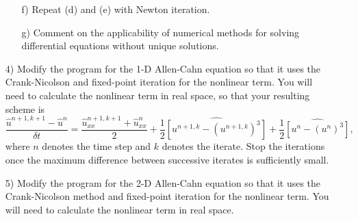 \begin{enumerate}
\begin{enumerate}
\item[f)] Repeat (d) and (e) with Newton iteration.
\item[g)] Comment on the applicability of numerical methods for solving differential equations without unique solutions.
\end{enumerate}
\item[4)] Modify the program for the 1-D Allen-Cahn equation so that it uses the Crank-Nicolson and fixed-point iteration for the nonlinear term. You will need to calculate the nonlinear term in real space, so that your resulting scheme is
\begin{equation}
\frac{\hat{u}^{n+1,k+1}-\hat{u}^n}{\delta t}=\frac{\hat{u}_{xx}^{n+1,k+1}+\hat{u}^n_{xx}}2 + \frac{1}{2}\widehat{\left[u^{n+1,k}- \left(u^{n+1,k} \right)^3\right]}+\frac{1}{2}\widehat{\left[u^{n}- \left(u^{n}\right)^3\right]},
\end{equation}
where $n$ denotes the time step and $k$ denotes the iterate. Stop the iterations once the maximum difference between successive iterates is sufficiently small.
\item[5)] Modify the program for the 2-D Allen-Cahn equation so that it uses the Crank-Nicolson method and fixed-point iteration for the nonlinear term. You will need to calculate the nonlinear term in real space.
\end{enumerate}

